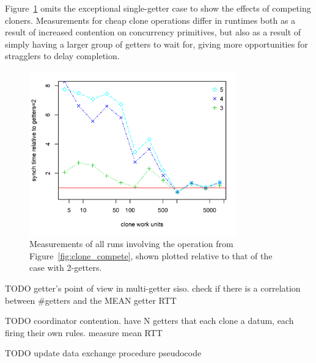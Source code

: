 Figure~\ref{fig:clone_compete_2} omits the exceptional single-getter case to show the effects of competing cloners. Measurements for cheap clone operations differ in runtimes both as a result of increased contention on concurrency primitives, but also as a result of simply having a larger group of getters to wait for, giving more opportunities for stragglers to delay completion. 


\begin{figure}
	\centering
	\includegraphics[width=0.80\textwidth]{experiments/clone_compete_2.png}
	\caption[Duration of interaction in siso connector with clonable data plotted relative to the speed of the 2-getter case.]{Measurements of all runs involving the  operation from Figure~\ref{fig:clone_compete}, shown plotted relative to that of the case with 2-getters.}
	\label{fig:clone_compete_2}
\end{figure}

TODO getter's point of view in multi-getter siso. check if there is a correlation between \#getters and the MEAN getter RTT

TODO coordinator contention. have N getters that each clone a datum, each firing their own rules. measure mean RTT

TODO update data exchange procedure pseudocode
